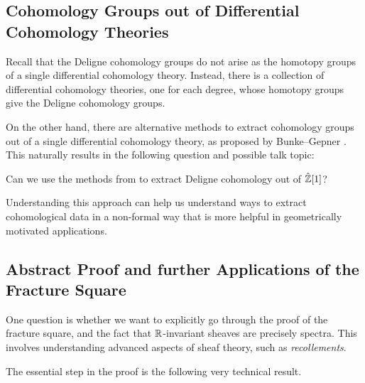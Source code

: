 \documentclass[10pt]{amsart}
\begin{document}
\subsection{Cohomology Groups out of Differential Cohomology Theories} \label{subsec:groups}
Recall that the Deligne cohomology groups do not arise as the homotopy groups of a single differential cohomology theory. Instead, there is a collection of differential cohomology theories, one for each degree, whose homotopy groups give the Deligne cohomology groups.

On the other hand, there are alternative methods to extract cohomology groups out of a single differential cohomology theory, as proposed by Bunke--Gepner \cite[Definition 2.23]{bunkegepner2021diffktheory}. This naturally results in the following question and possible talk topic:

\begin{question}
 Can we use the methods from \cite{bunkegepner2021diffktheory} to extract Deligne cohomology out of $\hat{\mathbb{Z}}[1]$?
\end{question}

Understanding this approach can help us understand ways to extract cohomological data in a non-formal way that is more helpful in geometrically motivated applications.

\subsection{Abstract Proof and further Applications of the Fracture Square} \label{subsec:abstract}
One question is whether we want to explicitly go through the proof of the fracture square, and the fact that $\mathbb{R}$-invariant sheaves are precisely spectra. This involves understanding advanced aspects of sheaf theory, such as \emph{recollements}.

The essential step in the proof is the following very technical result.
\end{document}
